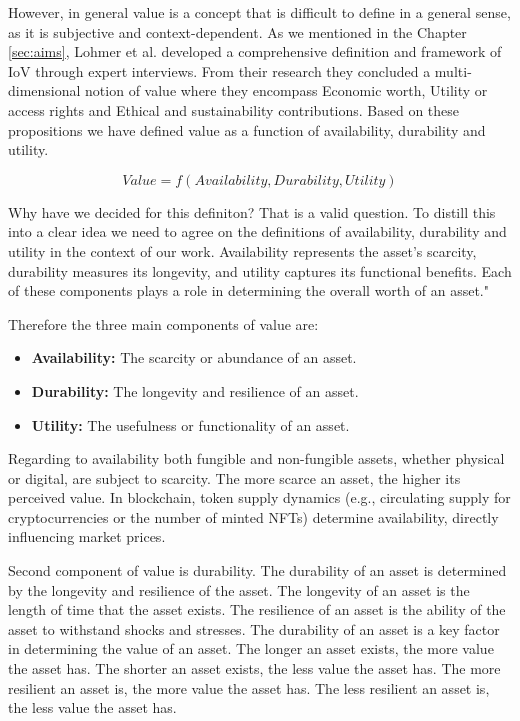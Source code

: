 However, in general value is a concept that is difficult to define in a general sense, as it is subjective and context-dependent. As we mentioned in the Chapter \ref{sec:aims}, Lohmer et al. \cite{Lohmer2024} developed a comprehensive definition and framework of IoV through expert interviews. From their research they concluded a multi-dimensional notion of value where they encompass  Economic worth, Utility or access rights and Ethical and sustainability contributions. Based on these propositions we have defined value as a function of availability, durability and utility.

\begin{equation}
  Value = f(Availability, Durability, Utility)
\end{equation}

Why have we decided for this definiton? That is a valid question. To distill this into a clear idea we need to agree on the definitions of availability, durability and utility in the context of our work. Availability represents the asset’s scarcity, durability measures its longevity, and utility captures its functional benefits. Each of these components plays a role in determining the overall worth of an asset."

Therefore the three main components of value are:
\begin{itemize}
    \item \textbf{Availability:} The scarcity or abundance of an asset.
    \item \textbf{Durability:} The longevity and resilience of an asset.
    \item \textbf{Utility:} The usefulness or functionality of an asset.
\end{itemize}


Regarding to availability both fungible and non-fungible assets, whether physical or digital, are subject to scarcity. The more scarce an asset, the higher its perceived value. In blockchain, token supply dynamics (e.g., circulating supply for cryptocurrencies or the number of minted NFTs) determine availability, directly influencing market prices.

Second component of value is durability. The durability of an asset is determined by the longevity and resilience of the asset. The longevity of an asset is the length of time that the asset exists. The resilience of an asset is the ability of the asset to withstand shocks and stresses. The durability of an asset is a key factor in determining the value of an asset. The longer an asset exists, the more value the asset has. The shorter an asset exists, the less value the asset has. The more resilient an asset is, the more value the asset has. The less resilient an asset is, the less value the asset has.

